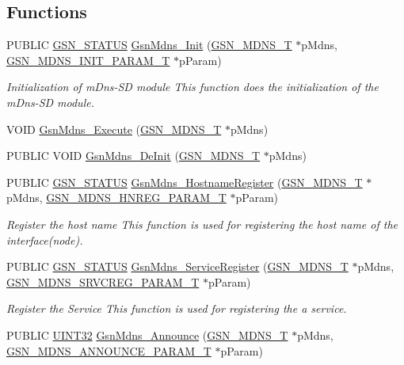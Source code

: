 \subsection*{Functions}
\begin{DoxyCompactItemize}
\item 
PUBLIC \hyperlink{a00660_gada5951904ac6110b1fa95e51a9ddc217}{GSN\_\-STATUS} \hyperlink{a00668_ga31494501067f7d00838a9908c8d4ec21}{GsnMdns\_\-Init} (\hyperlink{a00140}{GSN\_\-MDNS\_\-T} $\ast$pMdns, \hyperlink{a00144}{GSN\_\-MDNS\_\-INIT\_\-PARAM\_\-T} $\ast$pParam)
\begin{DoxyCompactList}\small\item\em Initialization of mDns-\/SD module This function does the initialization of the mDns-\/SD module. \end{DoxyCompactList}\item 
VOID \hyperlink{a00668_gaa61a8c72c78e9feca330c3c9116bf1bb}{GsnMdns\_\-Execute} (\hyperlink{a00140}{GSN\_\-MDNS\_\-T} $\ast$pMdns)
\item 
PUBLIC VOID \hyperlink{a00668_gab2b14677c4c68b1794decf709cf0c692}{GsnMdns\_\-DeInit} (\hyperlink{a00140}{GSN\_\-MDNS\_\-T} $\ast$pMdns)
\item 
PUBLIC \hyperlink{a00660_gada5951904ac6110b1fa95e51a9ddc217}{GSN\_\-STATUS} \hyperlink{a00668_gaaaa230657fa2a64f0b6a7d7f3129a2e4}{GsnMdns\_\-HostnameRegister} (\hyperlink{a00140}{GSN\_\-MDNS\_\-T} $\ast$pMdns, \hyperlink{a00143}{GSN\_\-MDNS\_\-HNREG\_\-PARAM\_\-T} $\ast$pParam)
\begin{DoxyCompactList}\small\item\em Register the host name This function is used for registering the host name of the interface(node). \end{DoxyCompactList}\item 
PUBLIC \hyperlink{a00660_gada5951904ac6110b1fa95e51a9ddc217}{GSN\_\-STATUS} \hyperlink{a00668_ga41a92cf9dd680c45ed3d5d0768e46547}{GsnMdns\_\-ServiceRegister} (\hyperlink{a00140}{GSN\_\-MDNS\_\-T} $\ast$pMdns, \hyperlink{a00149}{GSN\_\-MDNS\_\-SRVCREG\_\-PARAM\_\-T} $\ast$pParam)
\begin{DoxyCompactList}\small\item\em Register the Service This function is used for registering the a service. \end{DoxyCompactList}\item 
PUBLIC \hyperlink{a00660_gae1e6edbbc26d6fbc71a90190d0266018}{UINT32} \hyperlink{a00668_gaf0c7ac79063d0313f00e44b20d62d4af}{GsnMdns\_\-Announce} (\hyperlink{a00140}{GSN\_\-MDNS\_\-T} $\ast$pMdns, \hyperlink{a00141}{GSN\_\-MDNS\_\-ANNOUNCE\_\-PARAM\_\-T} $\ast$pParam)

\end{DoxyCompactItemize}
